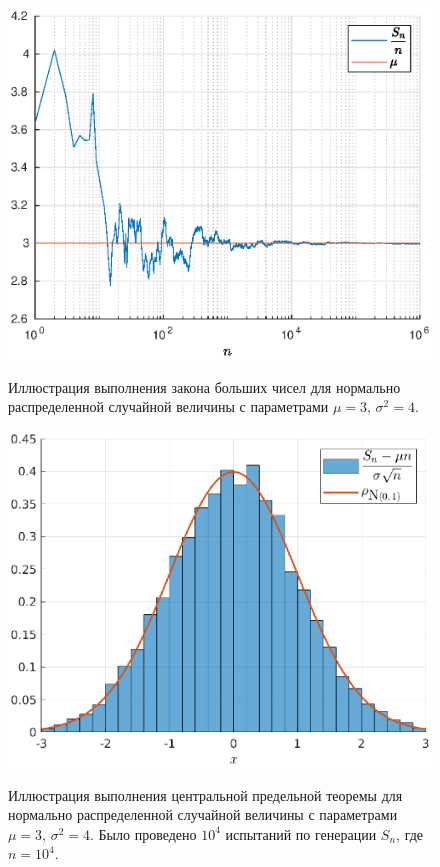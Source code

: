 \clearpage
\begin{figure}[t]
        \noindent
        \centering
        {
                \includegraphics[width=120mm]{task_05/zbc.eps}
        }
        \caption{Иллюстрация выполнения закона больших чисел для нормально распределенной случайной величины с параметрами $\mu = 3$, $\sigma^2 = 4$.}
\end{figure}
\begin{figure}[b]
        \noindent
        \centering
        {
                \includegraphics[width=120mm]{task_05/cpt10000-10000.eps}
        }
        \caption{Иллюстрация выполнения центральной предельной теоремы для нормально распределенной случайной величины с параметрами $\mu = 3$, $\sigma^2 = 4$. Было проведено $10^4$ испытаний по генерации $S_n$, где $n = 10^4$.}
\end{figure}
